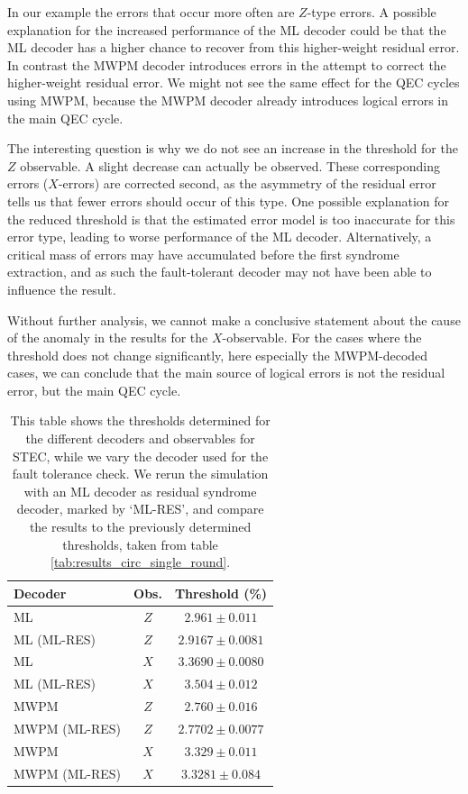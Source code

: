 In our example the errors that occur more often are $Z$-type errors.
A possible explanation for the increased performance of the ML decoder could be that the ML decoder has a higher chance to recover from this higher-weight residual error. 
In contrast the MWPM decoder introduces errors in the attempt to correct the higher-weight residual error. 
We might not see the same effect for the QEC cycles using MWPM, because the MWPM decoder already introduces logical errors in the main QEC cycle. 

The interesting question is why we do not see an increase in the threshold for the $Z$ observable.
A slight decrease can actually be observed.
These corresponding errors ($X$-errors) are corrected second, as the asymmetry of the residual error tells us that fewer errors should occur of this type. 
One possible explanation for the reduced threshold is that the estimated error model is too inaccurate for this error type,
leading to worse performance of the ML decoder.
Alternatively, a critical mass of errors may have accumulated before the first syndrome extraction,
and as such the fault-tolerant decoder may not have been able to influence the result.

Without further analysis, we cannot make a conclusive statement about the cause of the anomaly in the results for the $X$-observable.
For the cases where the threshold does not change significantly, here especially the MWPM-decoded cases, 
we can conclude that the main source of logical errors is not the residual error, but the main QEC cycle.


\begin{table}[th]
    \centering
    \begin{tabular}{lcc}
    \hline
    Decoder & Obs. & Threshold (\%) \\
    \hline
    ML   & $Z$ & $2.961 \pm 0.011$ \\
    ML (ML-RES)   & $Z$ & $2.9167 \pm 0.0081$ \\
    \hline
    ML   & $X$ & $3.3690 \pm 0.0080$ \\
    ML (ML-RES)   & $X$ & $3.504 \pm 0.012$ \\
    \hline
    MWPM & $Z$ & $2.760 \pm 0.016$ \\
    MWPM (ML-RES) & $Z$ & $2.7702 \pm 0.0077$ \\
    \hline
    MWPM & $X$ & $3.329 \pm 0.011$ \\
    MWPM (ML-RES) & $X$ & $3.3281 \pm 0.084$ \\
    \hline
    \end{tabular}
    \caption{
        This table shows the thresholds determined for the different decoders and observables for STEC, while we vary the decoder used for the fault tolerance check. 
        We rerun the simulation with an ML decoder as residual syndrome decoder, marked by `ML-RES', and compare the results to the previously determined thresholds, taken from table \ref{tab:results_circ_single_round}.
    }
    \label{tab:results_ft_test}
\end{table}



